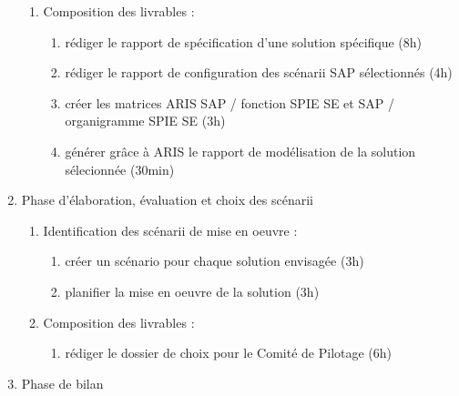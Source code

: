 \begin{enumerate}
\begin{enumerate}
            \item Composition des livrables : 
                \begin{enumerate}
                  \item rédiger le rapport de spécification d'une solution spécifique (8h)
                  \item rédiger le rapport de configuration des scénarii SAP sélectionnés (4h)
                  \item créer les matrices ARIS SAP / fonction SPIE SE et SAP / organigramme SPIE SE (3h)
                  \item générer grâce à ARIS le rapport de modélisation de la solution sélecionnée (30min)
                \end{enumerate}
          \end{enumerate}

    \item Phase d'élaboration, évaluation et choix des scénarii

          \begin{enumerate}
            \item Identification des scénarii de mise en oeuvre :
                \begin{enumerate}
                  \item créer un scénario pour chaque solution envisagée (3h)
                  \item planifier la mise en oeuvre de la solution (3h)
                \end{enumerate}
            \item Composition des livrables :
                \begin{enumerate}
                  \item rédiger le dossier de choix pour le Comité de Pilotage (6h)
                \end{enumerate}
          \end{enumerate}

\item Phase de bilan


\end{enumerate}
